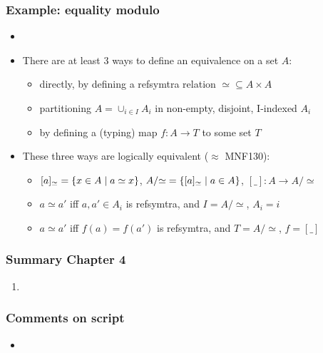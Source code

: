 \documentclass[handout]{beamer}
\begin{document}
\frame
  {   
    \frametitle{Example: equality modulo}\label{Ch4:Eqmod}

 \begin{itemize}[<+->]
\item 
\item There are at least 3 ways to define an equivalence on a set $A$:
   \begin{itemize}[<+->]
\item directly, by defining a refsymtra relation ${\simeq}\subseteq A\times A$
\item partitioning $A = \cup_{i\in I} A_i $ in non-empty, disjoint, I-indexed $A_i$
\item by defining a (typing) map $f: A\to T$ to some set $T$
   \end{itemize}
\item These three ways are logically equivalent ($\approx$ MNF130): 
   \begin{itemize}[<+->]
\item $[a]_\simeq = \{x\in A\mid a\simeq x\}$, 
$A/{\simeq}=\{[a]_\simeq \mid a\in A\}$, $[\_] : A \to A/{\simeq}$
\item $a\simeq a' $ iff $a,a' \in A_i$ is refsymtra, and $I = A/{\simeq}$, $A_i = i$
\item $a\simeq a' $ iff $f(a)=f(a')$ is refsymtra, and  $T = A/{\simeq}$, $f=[\_]$
   \end{itemize}
 \end{itemize}

 }



\frame
  {   
    \frametitle{Summary Chapter 4}\label{Ch4:Summary}

 \begin{enumerate}[<+->]
\item 
 \end{enumerate}


}

\frame
  {   
    \frametitle{Comments on script}\label{Ch4:comments}

 \begin{itemize}[<+->]
\item 
 \end{itemize}

 }
\end{document}
